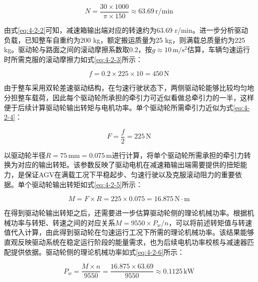 {{{        \begin{equation}
        N = \frac{30\times1000}{\pi\times150} \approx 63.69\,\mathrm{r/min}
        \label{eq:4-2-2}
        \end{equation}

        由式\eqref{eq:4-2-2}可知，减速箱输出端对应的转速约为63.69 r/min。进一步分析驱动负载，已知整车自重约为200 kg，额定搬运质量为25 kg，则满载总质量约为225 kg。驱动轮与路面之间的滚动摩擦系数取0.2，按$g\approx10\,\mathrm{m/s^2}$估算，车辆匀速运行时所需克服的滚动摩擦力如式\eqref{eq:4-2-3}所示：

        \begin{equation}
        f = 0.2\times225\times10 = 450\,\mathrm{N}
        \label{eq:4-2-3}
        \end{equation}

        由于整车采用双轮差速驱动结构，在匀速行驶状态下，两侧驱动轮能够比较均匀地分担整车载荷，因此每个驱动轮所承担的牵引力可近似看做总牵引力的一半，这样便于后续计算驱动轮输出转矩与电机功率。单个驱动轮所需牵引力近似为式\eqref{eq:4-2-4}：

        \begin{equation}
        F = \frac{f}{2} = 225\,\mathrm{N}
        \label{eq:4-2-4}
        \end{equation}

        以驱动轮半径$R=75\,\mathrm{mm}=0.075\,\mathrm{m}$进行计算，将单个驱动轮所需承担的牵引力转换为对应的输出转矩。该参数反映了驱动电机在减速箱输出端需要提供的扭矩能力，是保证AGV在满载工况下平稳起步、匀速行驶以及克服滚动阻力的重要依据。单个驱动轮输出转矩如式\eqref{eq:4-2-5}所示：

        \begin{equation}
        M = F\times R = 225\times0.075 = 16.875\,\mathrm{N\cdot m}
        \label{eq:4-2-5}
        \end{equation}

        在得到驱动轮输出转矩之后，还需要进一步估算驱动轮侧的理论机械功率。根据机械功率与转矩、转速之间的对应关系$M=9550\times P_w/n$，可以将前述转矩值与转速值代入计算，由此得到驱动轮在匀速运行工况下所需的理论机械功率。该结果能够直观反映驱动系统在稳定运行阶段的能量需求，也为后续电机功率校核与减速器匹配提供依据。驱动轮侧的理论机械功率如式\eqref{eq:4-2-6}所示：

        \begin{equation}
        P_w = \frac{M\times n}{9550} = \frac{16.875\times63.69}{9550} \approx 0.1125\,\mathrm{kW}
        \label{eq:4-2-6}
        \end{equation}

}}}
